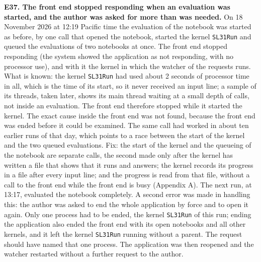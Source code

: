 \documentclass[
  10pt,
]{article}
\begin{document}
\textbf{E37. The front end stopped responding when an evaluation was
started, and the author was asked for more than was needed.} On 18
November 2026 at 12:19 Pacific time the evaluation of the notebook was
started as before, by one call that opened the notebook, started the
kernel \texttt{SL31Run} and queued the evaluations of two notebooks at
once. The front end stopped responding (the system showed the
application as not responding, with no processor use), and with it the
kernel in which the watcher of the requests runs. What is known: the
kernel \texttt{SL31Run} had used about 2 seconds of processor time in
all, which is the time of its start, so it never received an input line;
a sample of its threads, taken later, shows its main thread waiting at a
small depth of calls, not inside an evaluation. The front end therefore
stopped while it started the kernel. The exact cause inside the front
end was not found, because the front end was ended before it could be
examined. The same call had worked in about ten earlier runs of that
day, which points to a race between the start of the kernel and the two
queued evaluations. Fix: the start of the kernel and the queueing of the
notebook are separate calls, the second made only after the kernel has
written a file that shows that it runs and answers; the kernel records
its progress in a file after every input line; and the progress is read
from that file, without a call to the front end while the front end is
busy (Appendix A). The next run, at 13:17, evaluated the notebook
completely. A second error was made in handling this: the author was
asked to end the whole application by force and to open it again. Only
one process had to be ended, the kernel \texttt{SL31Run} of this run;
ending the application also ended the front end with its open notebooks
and all other kernels, and it left the kernel \texttt{SL31Run} running
without a parent. The request should have named that one process. The
application was then reopened and the watcher restarted without a
further request to the author.
\end{document}
